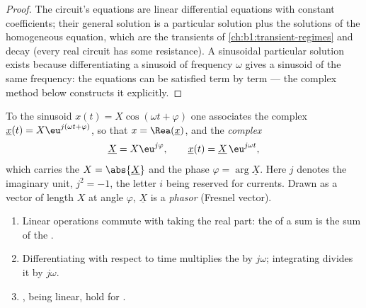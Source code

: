 \begin{proof}
The circuit's equations are linear differential equations with constant
coefficients; their general solution is a particular solution plus the
solutions of the homogeneous equation, which are the transients of
\cref{ch:b1:transient-regimes} and decay (every real circuit has some
resistance). A sinusoidal particular solution exists because
differentiating a sinusoid of frequency $\omega$ gives a sinusoid of
the same frequency: the equations can be satisfied term by term --- the
complex method below constructs it explicitly.
\end{proof}

\begin{definition}\label{def:b1:sinusoidal-impedance:complex}
To the sinusoid $x(t) = X\cos(\omega t + \varphi)$ one associates the
complex  $\underline{x}(t) = X\eu^{j(\omega t + \varphi)}$, so that
$x = \Rea(\underline{x})$, and the \emph{complex }
\[
\underline{X} = X\eu^{j\varphi}, \qquad \underline{x}(t) = \underline{X}\,\eu^{j\omega t},
\]
which carries the  $X = \abs{\underline{X}}$ and the phase
$\varphi = \arg\underline{X}$. Here $j$ denotes the imaginary unit,
$j^2 = -1$, the letter $i$ being reserved for currents. Drawn as a
vector of length $X$ at angle $\varphi$, $\underline{X}$ is a
\emph{phasor} (Fresnel vector).
\end{definition}

\begin{proposition}\label{prop:b1:sinusoidal-impedance:rules}
\begin{enumerate}
  \item Linear operations commute with taking the real part: the
         of a sum is the sum of the .
  \item Differentiating with respect to time multiplies the  by $j\omega$; integrating divides it by $j\omega$.
  \item {}, being linear, hold for .
\end{enumerate}
\end{proposition}

